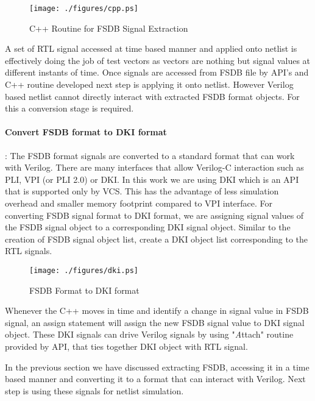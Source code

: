 \begin{figure}[h]
\centering
\texttt{[image: ./figures/cpp.ps]}
\caption{C++ Routine for FSDB Signal Extraction}
\label{fig:cpp.eps}
\end{figure}




A set of RTL signal accessed at time based manner and applied onto netlist is effectively doing the job of test vectors as vectors are nothing but signal values at different instants of time.
Once signals are accessed from FSDB file by API's and C++ routine developed next step is applying it onto netlist. However Verilog based netlist cannot directly interact with extracted FSDB format objects. For this a conversion stage is required.  




\paragraph{Convert FSDB format to DKI format}: The FSDB format signals are converted to a standard format that can work with Verilog. There are many interfaces that allow Verilog-C interaction such as PLI, VPI (or PLI 2.0) or DKI. 
In this work we are using DKI which is an API that is supported only by VCS. This has the advantage of less simulation overhead and smaller memory footprint compared to VPI interface.
For converting FSDB signal format to DKI format, we are assigning signal values of the FSDB signal object to a corresponding DKI signal object. Similar to the creation of FSDB signal object list, create a DKI object list corresponding to the RTL signals. 

\begin{figure}[h]
\centering
\texttt{[image: ./figures/dki.ps]}
\caption{FSDB Format to DKI format}
\label{fig:dki.eps}
\end{figure}



Whenever the C++ moves in time and identify a change in signal value in FSDB signal, an assign statement will assign the new FSDB signal value to DKI signal object.  These DKI signals can drive Verilog signals by using "{\emph Attach}" routine provided by API, that ties together DKI object with RTL signal. 

In the previous section we have discussed extracting FSDB, accessing it in a time based manner and converting it to a format that can interact with Verilog. Next step is using these signals for netlist simulation.

